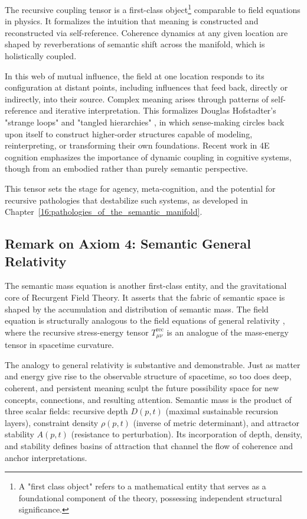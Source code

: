 The recursive coupling tensor is a first-class object\footnote{A "first class object" refers to a mathematical entity that serves as a foundational component of the theory, possessing independent structural significance.} comparable to field equations in physics. It formalizes the intuition that meaning is constructed and reconstructed via self-reference. Coherence dynamics at any given location are shaped by reverberations of semantic shift across the manifold, which is holistically coupled.

In this web of mutual influence, the field at one location responds to its configuration at distant points, including influences that feed back, directly or indirectly, into their source. Complex meaning arises through patterns of self-reference and iterative interpretation. This formalizes Douglas Hofstadter's "strange loops" and "tangled hierarchies" \autocite{Hofstadter1979, Hofstadter2007}, in which sense-making circles back upon itself to construct higher-order structures capable of modeling, reinterpreting, or transforming their own foundations. Recent work in 4E cognition \autocite{Newen2018, Gallagher2020} emphasizes the importance of dynamic coupling in cognitive systems, though from an embodied rather than purely semantic perspective.

This tensor sets the stage for agency, meta-cognition, and the potential for recursive pathologies that destabilize such systems, as developed in Chapter~\ref{16:pathologies_of_the_semantic_manifold}.


\subsection{Remark on Axiom 4: Semantic General Relativity}
\label{1.3.4:remark_1_4}

The semantic mass equation is another first-class entity, and the gravitational core of Recurgent Field Theory. It asserts that the fabric of semantic space is shaped by the accumulation and distribution of semantic mass. The field equation is structurally analogous to the field equations of general relativity \autocite{Einstein1915, MisnerThorneWheeler1973, Wald1984}, where the recursive stress-energy tensor \(T^{\text{rec}}_{\mu\nu}\) is an analogue of the mass-energy tensor in spacetime curvature.

The analogy to general relativity is substantive and demonstrable. Just as matter and energy give rise to the observable structure of spacetime, so too does deep, coherent, and persistent meaning sculpt the future possibility space for new concepts, connections, and resulting attention. Semantic mass is the product of three scalar fields: recursive depth \(D(p,t)\) (maximal sustainable recursion layers), constraint density \(\rho(p,t)\) (inverse of metric determinant), and attractor stability \(A(p,t)\) (resistance to perturbation). Its incorporation of depth, density, and stability defines basins of attraction that channel the flow of coherence and anchor interpretations.

